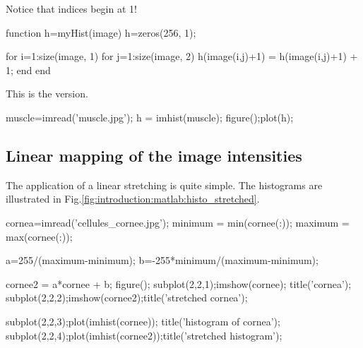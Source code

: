 Notice that \matlabregistered{} indices begin at 1!

\begin{matlab}
function h=myHist(image)
h=zeros(256, 1);

for i=1:size(image, 1)
	for j=1:size(image, 2)
		h(image(i,j)+1) = h(image(i,j)+1) + 1;
	end
end
\end{matlab}

This is the \matlabregistered{} version.
\begin{matlab}
muscle=imread('muscle.jpg');
h = imhist(muscle);
figure();plot(h);
\end{matlab}

\subsection{Linear mapping of the image intensities}
The application of a linear stretching is quite simple. The histograms are illustrated in Fig.\ref{fig:introduction:matlab:histo_stretched}.

\begin{matlab}
cornea=imread('cellules_cornee.jpg');
minimum = min(cornee(:));
maximum = max(cornee(:));

a=255/(maximum-minimum);
b=-255*minimum/(maximum-minimum);

cornee2 = a*cornee + b;
figure();
subplot(2,2,1);imshow(cornee); title('cornea');
subplot(2,2,2);imshow(cornee2);title('stretched cornea');

subplot(2,2,3);plot(imhist(cornee)); title('histogram of cornea');
subplot(2,2,4);plot(imhist(cornee2));title('stretched histogram');
\end{matlab}

